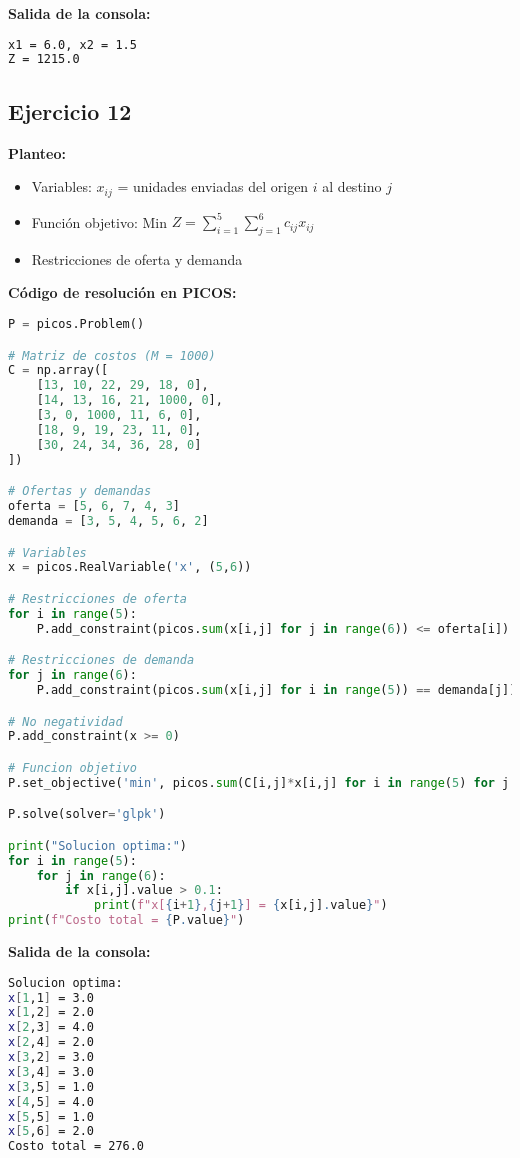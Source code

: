 \documentclass[12pt]{article}
\begin{document}
\textbf{Salida de la consola:}
\begin{lstlisting}[language=bash,backgroundcolor=\color{black},basicstyle=\color{white}\ttfamily,numbers=none]
x1 = 6.0, x2 = 1.5
Z = 1215.0
\end{lstlisting}

\subsection*{Ejercicio 12}

\textbf{Planteo:}
\begin{itemize}
\item Variables: $x_{ij}$ = unidades enviadas del origen $i$ al destino $j$
\item Función objetivo: Min $Z = \sum_{i=1}^5 \sum_{j=1}^6 c_{ij}x_{ij}$
\item Restricciones de oferta y demanda
\end{itemize}

\textbf{Código de resolución en PICOS:}
\begin{lstlisting}[language=Python]
P = picos.Problem()

# Matriz de costos (M = 1000)
C = np.array([
    [13, 10, 22, 29, 18, 0],
    [14, 13, 16, 21, 1000, 0],
    [3, 0, 1000, 11, 6, 0],
    [18, 9, 19, 23, 11, 0],
    [30, 24, 34, 36, 28, 0]
])

# Ofertas y demandas
oferta = [5, 6, 7, 4, 3]
demanda = [3, 5, 4, 5, 6, 2]

# Variables
x = picos.RealVariable('x', (5,6))

# Restricciones de oferta
for i in range(5):
    P.add_constraint(picos.sum(x[i,j] for j in range(6)) <= oferta[i])

# Restricciones de demanda
for j in range(6):
    P.add_constraint(picos.sum(x[i,j] for i in range(5)) == demanda[j])

# No negatividad
P.add_constraint(x >= 0)

# Funcion objetivo
P.set_objective('min', picos.sum(C[i,j]*x[i,j] for i in range(5) for j in range(6)))

P.solve(solver='glpk')

print("Solucion optima:")
for i in range(5):
    for j in range(6):
        if x[i,j].value > 0.1:
            print(f"x[{i+1},{j+1}] = {x[i,j].value}")
print(f"Costo total = {P.value}")
\end{lstlisting}

\textbf{Salida de la consola:}
\begin{lstlisting}[language=bash,backgroundcolor=\color{black},basicstyle=\color{white}\ttfamily,numbers=none]
Solucion optima:
x[1,1] = 3.0
x[1,2] = 2.0
x[2,3] = 4.0
x[2,4] = 2.0
x[3,2] = 3.0
x[3,4] = 3.0
x[3,5] = 1.0
x[4,5] = 4.0
x[5,5] = 1.0
x[5,6] = 2.0
Costo total = 276.0
\end{lstlisting}
\end{document}
